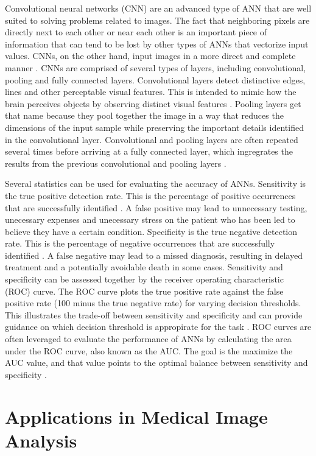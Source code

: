 \documentclass[sigconf]{acmart}
\begin{document}
Convolutional neural networks (CNN) are an advanced type of ANN that are well suited to solving problems related to images. The fact that neighboring pixels are directly next to each other or near each other is an important piece of information that can tend to be lost by other types of ANNs that vectorize input values. CNNs, on the other hand, input images in a more direct and complete manner \cite{cite06}. CNNs are comprised of several types of layers, including convolutional, pooling and fully connected layers. Convolutional layers detect distinctive edges, lines and other perceptable visual features. This is intended to mimic how the brain perceives objects by observing distinct visual features \cite{cite05}. Pooling layers get that name because they pool together the image in a way that reduces the dimensions of the input sample while preserving the important details identified in the convolutional layer. Convolutional and pooling layers are often repeated several times before arriving at a fully connected layer, which ingregrates the results from the previous convolutional and pooling layers \cite{cite05}.

Several statistics can be used for evaluating the accuracy of ANNs. Sensitivity is the true positive detection rate. This is the percentage of positive occurrences that are successfully identified \cite{cite11}. A false positive may lead to unnecessary testing, unecessary expenses and unecessary stress on the patient who has been led to believe they have a certain condition. Specificity is the true negative detection rate. This is the percentage of negative occurrences that are successfully identified \cite{cite11}. A false negative may lead to a missed diagnosis, resulting in delayed treatment and a potentially avoidable death in some cases. Sensitivity and specificity can be assessed together by the receiver operating characteristic (ROC) curve. The ROC curve plots the true positive rate against the false positive rate (100 minus the true negative rate) for varying decision thresholds. This illustrates the trade-off between sensitivity and specificity and can provide guidance on which decision threshold is appropirate for the task \cite{cite11}. ROC curves are often leveraged to evaluate the performance of ANNs by calculating the area under the ROC curve, also known as the AUC. The goal is the maximize the AUC value, and that value points to the optimal balance between sensitivity and specificity \cite{cite11}.

\section{Applications in Medical Image Analysis}
\end{document}
